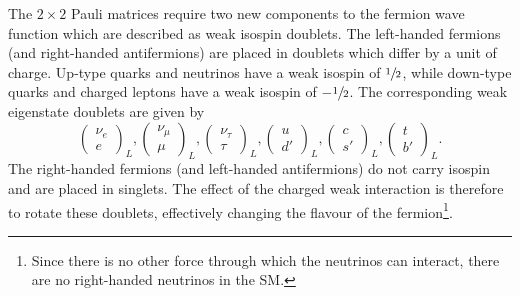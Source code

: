The $2 \times 2$ Pauli matrices require two new components to the fermion wave function which are described as weak isospin doublets.
The left-handed fermions (and right-handed antifermions)
are placed in doublets which differ by a unit of charge.
Up-type quarks and neutrinos have a weak isospin of $\sfrac{1}{2}$, while down-type quarks and charged leptons have a weak isospin of $-\sfrac{1}{2}$.
The corresponding weak eigenstate doublets are given by
\begin{equation}
    \label{eq:weak_isospin}
    \begin{pmatrix} \nu_e \\ e \end{pmatrix}_L,
    \begin{pmatrix} \nu_\mu \\ \mu \end{pmatrix}_L,
    \begin{pmatrix} \nu_\tau \\ \tau \end{pmatrix}_L,
    \begin{pmatrix} u \\ d' \end{pmatrix}_L,
    \begin{pmatrix} c \\ s' \end{pmatrix}_L,
    \begin{pmatrix} t \\ b' \end{pmatrix}_L.
\end{equation}
The right-handed fermions (and left-handed antifermions) do not carry isospin and are placed in singlets.
The effect of the charged weak interaction is therefore to rotate these doublets, effectively changing the flavour of the fermion\footnote{Since there is no other force through which the neutrinos can interact, there are no right-handed neutrinos in the \Gls{SM}.}.

